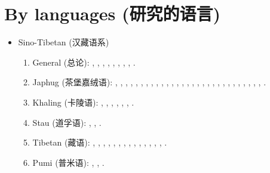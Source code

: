 \documentclass[oneside,a4paper,11pt]{article}
\newcommand{\zh}[1]{{\cn #1}}
\newcommand{\lingua}[3]{#1 (\zh{#3})}
\begin{document}
\section{\lingua{By languages}{Publications classées par langue étudiée}{研究的语言}}
\begin{itemize}
\item \lingua{Sino-Tibetan}{Sino-tibétain}{汉藏语系}
\begin{enumerate}
\item \lingua{General}{Général}{总论}: \cite{jacques03s.houzhui}, \cite{jacques06morpho}, \cite{jacques07chang}, \cite{antonov12kumush}, \cite{jacques12agreement},    \cite{michaud-jacques12nasalite}, \cite{jacques16th}, \cite{jacques16polysynthetique}, \cite{jacques17rgy}.     
\item \lingua{Japhug}{Japhug}{茶堡嘉绒语}:  \cite{jacques04redupl},     \cite{jacques04these},   \cite{jacques07passif},  \cite{jacques07redupl}, \cite{jacques08},  \cite{jacques10gesar}, \cite{jacques10refl},  \cite{jacques10inverse},  \cite{jacques12incorp},   \cite{jacques12demotion},  \cite{jacques13harmonization},  \cite{jacques13tropative}, \cite{jacques14antipassive}, \cite{japhug14ideophones}, \cite{jacques14inverse}, \cite{jacques14linking}, \cite{jacques16comparative}, \cite{jacques15causative}, \cite{jacques15japhug}, \cite{jacques16relatives}, \cite{jacques16complementation}, \cite{jacques17sketch}, \cite{jacques17num}, \cite{jacques17comitative}, \cite{jacques17volitional}, \cite{jacques18ipa}, \cite{jacques18generic}, \cite{jacques18bipartite}, \cite{jacques19contact}, \cite{jacques19egophoric}.
\item \lingua{Khaling}{Khaling}{卡陵语}: \cite{jacques12khaling},  \cite{jacques13derivational.khaling}, \cite{jacques14auditory}, \cite{jacques15derivational.khaling}, \cite{jacques15khaling},  \cite{jacques16si}, \cite{jacques16tonogenesis}.
\item \lingua{Stau}{Stau}{道孚语}: \cite{antonov14rtau}, \cite{jacques14rtau}, \cite{jacques17stau}.
\item \lingua{Tibetan}{Tibétain}{藏语}:  \cite{jacques01dg}, \cite{jacques04thimphu}, \cite{jacques07naksatram},      \cite{jacques08debther},  \cite{jacques09wazur}, \cite{jacques09e},  \cite{jacques10zos},   \cite{jacques10ndr},  \cite{jacques11lingua},  \cite{jacques12internal},  \cite{jacques12transcription}, \cite{jacques13yod}, \cite{jacques14snom}, \cite{jacques14cone}, \cite{jacques19contact}.
\item \lingua{Pumi}{Pumi}{普米语}:  \cite{michaud10bonin}, \cite{jacques11pumi.tone}, \cite{jacques11lingua}.

\end{enumerate}
\end{itemize}
\end{document}
